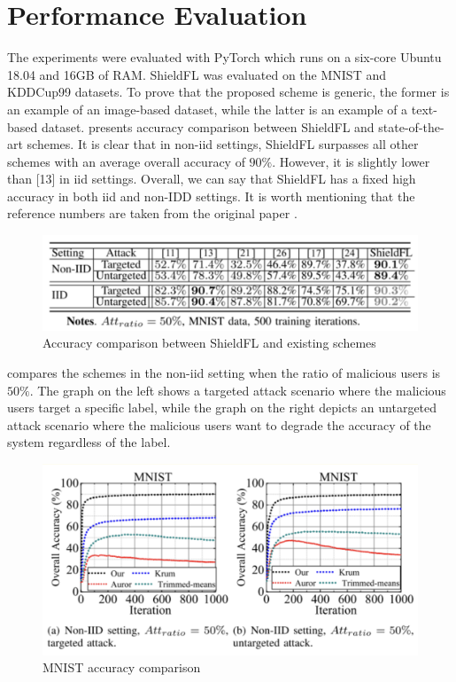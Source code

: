 \section{Performance Evaluation}
\label{sec:performance-eval}

The experiments were evaluated with PyTorch which runs on a six-core Ubuntu 18.04 and 16GB of RAM.
ShieldFL was evaluated on the MNIST \cite{deng2012mnist} and KDDCup99 \cite{tavallaee2009detailed} datasets.
To prove that the proposed scheme is generic, the former is an example of an image-based dataset, while the latter is an example of a text-based dataset.
 presents accuracy comparison between ShieldFL and state-of-the-art schemes.
It is clear that in non-\ac{iid} settings, ShieldFL surpasses all other schemes with an average overall accuracy of $90\%$.
However, it is slightly lower than [13] in \ac{iid} settings.
Overall, we can say that ShieldFL has a fixed high accuracy in both \ac{iid} and non-IDD settings.
It is worth mentioning that the reference numbers are taken from the original paper \cite{ma2022shieldfl}.

\begin{figure}[thb]
\centering
  \includegraphics[width=0.8\linewidth]{resources/accuracy-comparison-table.pdf}
  \caption{Accuracy comparison between ShieldFL and existing schemes}
  \label{fig:acc-comparison}
\end{figure}

 compares the schemes in the non-\ac{iid} setting when the ratio of malicious users is $50\%$.
The graph on the left shows a targeted attack scenario where the malicious users target a specific label, while the graph on the right depicts an untargeted attack scenario where the malicious users want to degrade the accuracy of the system regardless of the label.

\begin{figure}[thb]
\centering
  \includegraphics[width=0.8\linewidth]{resources/mnist-accuracy-comparison.pdf}
  \caption{MNIST accuracy comparison}
  \label{fig:mnsist-accuracy-comparison}
\end{figure}

